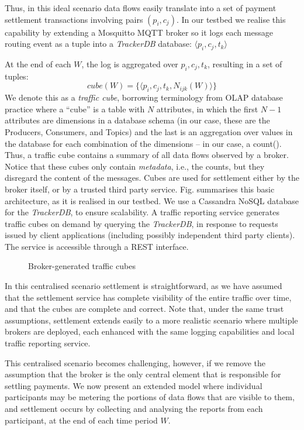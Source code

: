 \documentclass[conference]{IEEEtran}
\begin{document}
Thus, in this ideal scenario data flows easily translate into a set of payment settlement transactions involving pairs $(p_i, c_j)$.
In our testbed we realise this capability by extending a Mosquitto MQTT broker so it logs each message routing event as a tuple into a \textit{TrackerDB} database:
$ \langle p_i, c_j, t_k \rangle $

At the end of each $W$, the log is aggregated over $p_i, c_j, t_k$, resulting in a set of tuples:
\begin{equation}\label{eq:cube}
\mathit{cube}(W) = \{ \langle p_i, c_j, t_k, N_{ijk}(W) \rangle \}
\end{equation}
We denote this  as a \textit{traffic cube}, borrowing terminology from OLAP database practice where a  ``cube'' is a table with $ N $ attributes, in which the first $ N-1 $ attributes are  dimensions in a database schema (in our case, these are the Producers, Consumers, and Topics) and the last is an aggregation over values in the database for each combination of the dimensions -- in our case, a count().
Thus, a traffic cube contains a summary  of all data flows observed by a broker. Notice that these cubes only contain \textit{metadata}, i.e., the counts, but they disregard the content of the messages.
%
Cubes are used for settlement either by the broker itself, or by a trusted third party service. Fig.  summarises this basic architecture, as it is realised in our testbed. 
We use a Cassandra NoSQL database for the \textit{TrackerDB}, to ensure scalability. 
A traffic reporting service generates traffic cubes on demand by querying the \textit{TrackerDB}, in response to requests issued by client applications (including possibly independent third party clients). The service is accessible through a REST interface.

\begin{figure}
	\caption{Broker-generated traffic cubes}
	\label{fig:cubes}
\end{figure}

In this centralised scenario settlement is straightforward, as we have assumed that the settlement service has complete visibility of the entire traffic over time, and that the cubes are complete and correct.
Note that, under the same trust assumptions, settlement extends easily to a more realistic scenario where multiple brokers are deployed, each enhanced with the same logging capabilities and local traffic reporting service.

This centralised scenario becomes challenging, however, if we remove the assumption that the broker is the only central element that is responsible for settling payments.
We now present an extended model where individual participants may be metering the portions of data flows that are visible to them, and settlement occurs by collecting and analysing the reports from each participant, at the end of each time period $W$.
\end{document}
